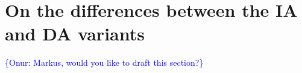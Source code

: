 \documentclass[gmd, manuscript, draft]{copernicus}
\newcommand{\onur}[1]{\textcolor{blue}{\{Onur: #1\}}}
\begin{document}
\section{On the differences between the IA and DA variants}\label{S:appIADA}  %
\onur{Markus, would you like to draft this section?}

\noappendix%













\end{document}
